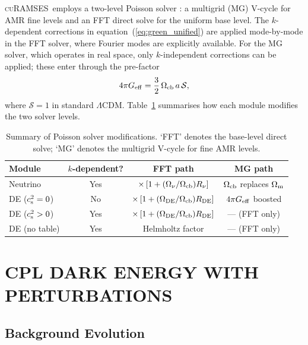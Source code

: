 \documentclass[fleqn,usenatbib]{mnras}
\newcommand{\curamses}{\textsc{cuRAMSES}}
\newcommand{\Onu}{\Omega_\nu}
\newcommand{\Ocb}{\Omega_{\rm cb}}
\newcommand{\Om}{\Omega_{\rm m}}
\newcommand{\Ode}{\Omega_{\rm DE}}
\newcommand{\Rnu}{R_\nu}
\newcommand{\Rde}{R_{\rm DE}}
\newcommand{\cst}{c_{\rm s}^2}
\begin{document}
\curamses\ employs a two-level Poisson solver \citep{Guillet2011,Kim2026}:
a multigrid (MG) V-cycle for AMR fine levels and an FFT direct solve
for the uniform base level.  The $k$-dependent corrections in
equation~(\ref{eq:green_unified}) are applied mode-by-mode in the FFT
solver, where Fourier modes are explicitly available.  For the MG
solver, which operates in real space, only $k$-independent corrections
can be applied; these enter through the pre-factor
\begin{equation}
4\pi G_{\rm eff} = \frac{3}{2}\,\Ocb\,a\,\mathcal{S},
\label{eq:fourpi}
\end{equation}
where $\mathcal{S} = 1$ in standard $\Lambda$CDM.  Table~\ref{tab:solver_summary}
summarises how each module modifies the two solver levels.

\begin{table}
\centering
\caption{Summary of Poisson solver modifications.  `FFT' denotes the
  base-level direct solve; `MG' denotes the multigrid V-cycle for
  fine AMR levels.}
\label{tab:solver_summary}
\small
\begin{tabular}{lccc}
\toprule
Module & $k$-dependent? & FFT path & MG path \\
\midrule
Neutrino         & Yes           & $\times\,[1+(\Onu/\Ocb)\Rnu]$ & $\Ocb$ replaces $\Om$ \\
DE ($\cst=0$)    & No            & $\times\,[1+(\Ode/\Ocb)\Rde]$ & $4\pi G_{\rm eff}$ boosted \\
DE ($\cst>0$)    & Yes           & $\times\,[1+(\Ode/\Ocb)\Rde]$ & --- (FFT only) \\
DE (no table)    & Yes           & Helmholtz factor & --- (FFT only) \\
\bottomrule
\end{tabular}
\end{table}


\section{CPL DARK ENERGY WITH PERTURBATIONS}
\label{sec:de}

\subsection{Background Evolution}
\label{sec:de_background}
\end{document}
